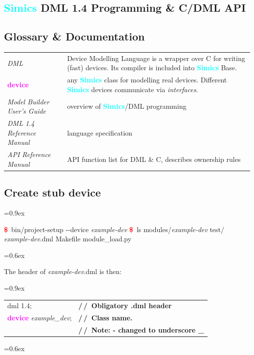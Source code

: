 \documentclass[8pt]{extarticle}
\newenvironment{code}[1][]{%
\begin{prebox}[#1]\obeylines%
\fontdimen2\font=0.9ex%
}{%
\end{prebox}%
\fontdimen2\font=0.6ex%
}
\newcommand{\prompt}{\textcolor{red}{\textbf{\$}\ }}
\newcommand{\kw}[1]{\textcolor{magenta}{\textbf{#1}}}
\newcommand{\cmtcommon}[1]{\textcolor{Sepia}{\textbf{#1}}}
\newcommand{\cmtd}[1]{\cmtcommon{/\,/\ #1}}
\newcommand{\p}[1]{\textit{\large#1}}
\newcommand{\Simics}{\textcolor{cyan}{\textbf{Simics}}}
\newlength{\MyLen}
\begin{document}
\begin{multicols*}{3}
\section{\Simics{} DML 1.4 Programming \& C/DML API}

\subsection{Glossary \& Documentation}
    \begin{tabular}{p{\the\MyLen}p{\linewidth-\the\MyLen-0.8cm}}
        \textit{DML}         & Device Modelling Language is a
        wrapper over C for writing (fast) devices.
        Its compiler is included into \Simics{} Base.
        \\
        \kw{device}          & any \Simics{} class for modelling real
        devices. Different \Simics{} devices communicate via \textit{interfaces}.
        \\
        \textit{Model Builder User’s Guide} & overview of \Simics{}/DML
        programming \\
        \textit{DML 1.4 Reference Manual} & language specification \\
        \textit{API Reference Manual} & API function list for DML \& C,
        describes ownership rules
    \end{tabular}

\subsection{Create stub device}

\begin{code}
    \prompt bin/project-setup -{}-device \p{example-dev}
    \prompt ls modules/\p{example-dev}
    test/  \p{example-dev}.dml  Makefile  module_load.py
\end{code}

The header of \p{example-dev}.dml is then:

\begin{code}
    \begin{tabular}{ll}
        dml 1.4;                  & \cmtd{Obligatory .dml header} \\
        \kw{device} \p{example_dev};  & \cmtd{Class name.} \\
                                  & \cmtd{Note: - changed to underscore _}
    \end{tabular}
\end{code}


\end{multicols*}
\end{document}
